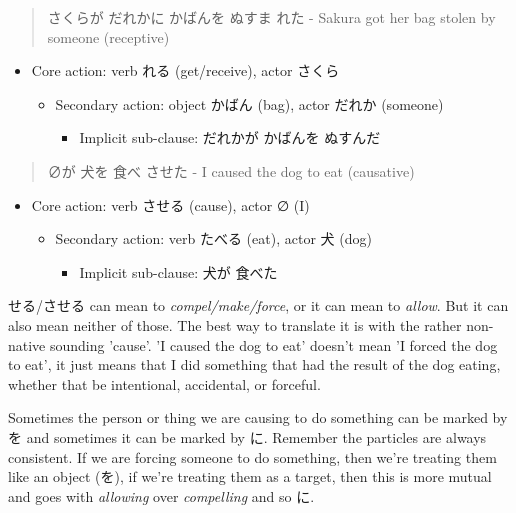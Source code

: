 \documentclass[11pt]{article}
\begin{document}
\begin{quote}
さくらが だれかに かばんを ぬすま れた - Sakura got her bag stolen by someone (receptive)
\end{quote}
\begin{itemize}
\item Core action: verb れる (get/receive), actor さくら
\begin{itemize}
\item Secondary action: object かばん (bag), actor だれか (someone)
\begin{itemize}
\item Implicit sub-clause: だれかが かばんを ぬすんだ
\end{itemize}
\end{itemize}
\end{itemize}

\begin{quote}
∅が 犬を 食べ させた - I caused the dog to eat (causative)
\end{quote}
\begin{itemize}
\item Core action: verb させる (cause), actor ∅ (I)
\begin{itemize}
\item Secondary action: verb たべる (eat), actor 犬 (dog)
\begin{itemize}
\item Implicit sub-clause: 犬が 食べた
\end{itemize}
\end{itemize}
\end{itemize}

せる/させる can mean to \emph{compel/make/force}, or it can mean to \emph{allow}. But it can also mean neither of those. The best way to translate it is with the rather non-native sounding 'cause'. 'I caused the dog to eat' doesn't mean 'I forced the dog to eat', it just means that I did something that had the result of the dog eating, whether that be intentional, accidental, or forceful.

Sometimes the person or thing we are causing to do something can be marked by を and sometimes it can be marked by に. Remember the particles are always consistent. If we are forcing someone to do something, then we're treating them like an object (を), if we're treating them as a target, then this is more mutual and goes with \emph{allowing} over \emph{compelling} and so に.
\end{document}
